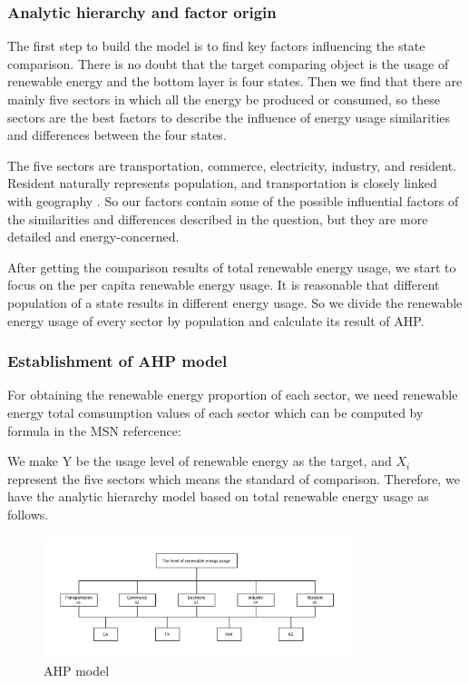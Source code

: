 \documentclass[a4paper,11pt]{article}
\begin{document}
\subsubsection{Analytic hierarchy and factor origin}

\par The first step to build the model is to find key factors influencing the state comparison. There is no doubt that the target comparing object is the usage of renewable energy and the bottom layer is four states. Then we find that there are mainly five sectors in which all the energy be produced or consumed, so these sectors are the best factors to describe the influence of energy usage similarities and differences between the four states.

\par The five sectors are transportation, commerce, electricity, industry, and resident. Resident naturally represents population, and transportation is closely linked with geography \cite{L1}. So our factors contain some of the possible influential factors of the similarities and differences described in the question, but they are more detailed and energy-concerned.

\par After getting the comparison results of total renewable energy usage, we start to focus on the per capita renewable energy usage. It is reasonable that different population of a state results in different energy usage. So we divide the renewable energy usage of every sector by population and calculate its result of AHP.

\subsubsection{Establishment of AHP model}

\par For obtaining the renewable energy proportion of each sector, we need renewable energy total comsumption values of each sector which can be computed by formula in the MSN refercence:

\par We make Y be the usage level of renewable energy as the target, and $X_i$ represent the five sectors which means the standard of comparison. Therefore, we have the analytic hierarchy model based on total renewable energy usage as follows.\cite{6}

\begin{figure}[H] 
    \centering 
    \includegraphics[width=0.8\textwidth]{./Pic/AHP.pdf}
    \caption{AHP model}
\end{figure}
\end{document}
